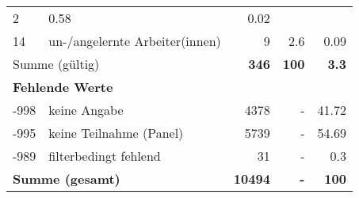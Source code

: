 \begin{longtable}{lXrrr}
       \num{2} &
       \num[round-mode=places,round-precision=2]{0,58} &
         \num[round-mode=places,round-precision=2]{0,02} \\

     14 &
     \multicolumn{1}{X}{ un-/angelernte Arbeiter(innen)   } &


       \num{9} &
       \num[round-mode=places,round-precision=2]{2,6} &
         \num[round-mode=places,round-precision=2]{0,09} \\
     \midrule
     \multicolumn{2}{l}{Summe (gültig)} &
       \textbf{\num{346}} &
     \textbf{100} &
       \textbf{\num[round-mode=places,round-precision=2]{3,3}} \\
     \multicolumn{5}{l}{\textbf{Fehlende Werte}}\\
       -998 &
       keine Angabe &
         \num{4378} &
        - &
         \num[round-mode=places,round-precision=2]{41,72} \\
       -995 &
       keine Teilnahme (Panel) &
         \num{5739} &
        - &
         \num[round-mode=places,round-precision=2]{54,69} \\
       -989 &
       filterbedingt fehlend &
         \num{31} &
        - &
         \num[round-mode=places,round-precision=2]{0,3} \\
     \midrule
     \multicolumn{2}{l}{\textbf{Summe (gesamt)}} &
          \textbf{\num{10494}} &
        \textbf{-} &
        \textbf{100} \\
     \bottomrule
     \end{longtable}
     
